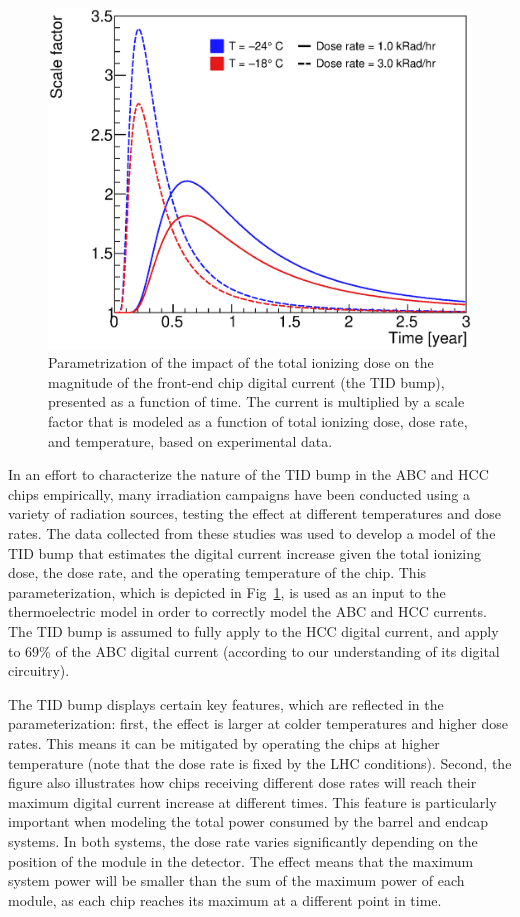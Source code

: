 \begin{figure}[ht]
\centering
\includegraphics[width=0.5\linewidth]{figures/AbcTidBumpVersionRatesAndTemps_Nominal.eps}
\caption{Parametrization of the impact of the total ionizing dose
on the magnitude of the front-end chip digital current (the TID bump), presented as a function of time.
The current is multiplied by a scale factor that is modeled as a function of total ionizing dose,
dose rate, and temperature, based on experimental data.
}
\label{tid_bump}
\end{figure}

In an effort to characterize the nature of the TID bump in the ABC and HCC chips empirically,
many irradiation campaigns have been conducted using a variety of radiation sources, testing
the effect at different temperatures and dose rates.
The data collected from these studies was used to develop a model of the TID bump
that estimates the digital current increase given the total ionizing dose, the dose rate,
and the operating temperature of the chip. This parameterization, which is depicted in
Fig~\ref{tid_bump}, is used as an input to the thermoelectric model in order to correctly model the
ABC and HCC currents. The TID bump is assumed to fully apply to the HCC digital current, and apply to
69\% of the ABC digital current (according to our understanding of its digital circuitry).

The TID bump displays certain key features, which are reflected in the parameterization:
first, the effect is larger at colder temperatures and higher dose rates. This means it can be
mitigated by operating the chips at higher temperature (note that the dose rate is fixed by the LHC conditions).
Second, the figure also illustrates how chips receiving different dose rates will reach their maximum
digital current increase at different times. This feature is particularly important when modeling the
total power consumed by the barrel and endcap systems. In both systems, the dose rate varies significantly
depending on the position of the module in the detector. The effect means that the maximum system
power will be smaller than the sum of the maximum power of each module, as each chip reaches
its maximum at a different point in time.

